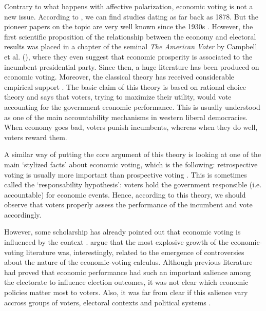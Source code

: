 \documentclass[a4paper, svgnames]{article}
\begin{document}
Contrary to what happens with affective polarization, economic voting is not a new issue. According to \cite{Lewis-Beck2018}, we can find studies dating as far back as 1878. But the pioneer papers on the topic are very well known since the 1930s \citep{Tibbitts2015, Gosnell1940, Wilkinson1950}. However, the first scientific proposition of the relationship between the economy and electoral results was placed in a chapter of the seminal \textit{The American Voter} by Campbell et al. (\citeyear[Chapter 14]{Campbell1960}), where they even suggest that economic prosperity is associated to the incumbent presidential party. Since then, a huge literature has been produced on economic voting. Moreover, the classical theory has received considerable empirical support \citep{Kinder1979, Lewis-Beck1988, Lewis-Beck2000, LewisBeck2007, Lewis-Beck2011}. The basic claim of this theory is based on rational choice theory and says that voters, trying to maximize their utility, would vote accounting for the government economic performance. This is usually understood as one of the main accountability mechanisms in western liberal democracies. When economy goes bad, voters punish incumbents, whereas when they do well, voters reward them.

A similar way of putting the core argument of this theory is looking at one of the main `stylized facts' about economic voting, which is the following: retrospective voting is usually more important than prospective voting \citep{Lewis-Beck2000}. This is sometimes called the `responsability hypothesis': voters hold the government responsible (i.e. accountable) for economic events. Hence, according to this theory, we should observe that voters properly assess the performance of the incumbent and vote accordingly.

However, some scholarship has already pointed out that economic voting is influenced by the context \citep{Dorussen2002, Anderson2007, Singer2015}. \cite{Dorussen2002} argue that the most explosive growth of the economic-voting literature was, interestingly, related to the emergence of controversies about the nature of the economic-voting calculus. Although previous literature had proved that economic performance had such an important salience among the electorate to influence election outcomes, it was not clear which economic policies matter most to voters. Also, it was far from clear if this salience vary accross groups of voters, electoral contexts and political systems \citep{Dorussen2002}.
\end{document}
